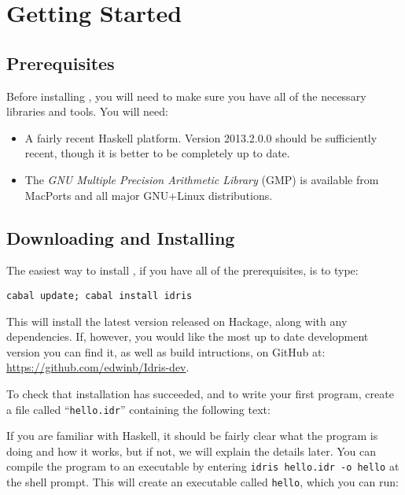 \section{Getting Started}

\subsection{Prerequisites}

Before installing \Idris{}, you will need to make sure you have all of the necessary libraries and tools.
You will need:

\begin{itemize}
\item A fairly recent Haskell platform. Version 2013.2.0.0
should be sufficiently recent, though it is better to be completely up to
date.
\item The \emph{GNU Multiple Precision Arithmetic Library} (GMP) is available from MacPorts and all major GNU+Linux distributions.
\end{itemize}

\subsection{Downloading and Installing}

The easiest way to install \Idris{}, if you have all of the prerequisites, is to type:

\begin{lstlisting}[style=stdout]
cabal update; cabal install idris
\end{lstlisting}

\noindent
This will install the latest version released on Hackage, along with any dependencies.
If, however, you would like the most up to date development version you can find it, as well as build intructions, on GitHub at: \url{https://github.com/edwinb/Idris-dev}.

To check that installation has succeeded, and to write your first \Idris{} program, create a file called ``\texttt{hello.idr}'' containing the following text:


\noindent
If you are familiar with Haskell, it should be fairly clear what the program is doing and how it works, but if not, we will explain the details later.
You can compile the program to an executable by entering \texttt{idris hello.idr -o hello} at the shell prompt.
This will create an executable called \texttt{hello}, which you can run:

